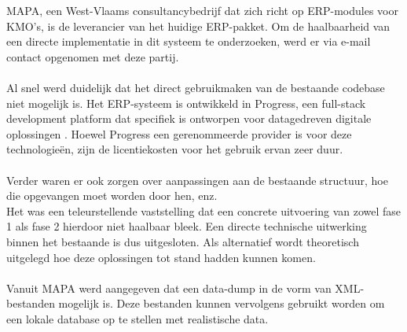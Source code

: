MAPA, een West-Vlaams consultancybedrijf dat zich richt op ERP-modules voor KMO's, is de leverancier van het huidige ERP-pakket. Om de haalbaarheid van een directe implementatie in dit systeem te onderzoeken, werd er via e-mail contact opgenomen met deze partij.
\\
\\
Al snel werd duidelijk dat het direct gebruikmaken van de bestaande codebase niet mogelijk is. Het ERP-systeem is ontwikkeld in Progress, een full-stack development platform dat specifiek is ontworpen voor datagedreven digitale oplossingen \autocite{PSC2026}. Hoewel Progress een gerenommeerde provider is voor deze technologieën, zijn de licentiekosten voor het gebruik ervan zeer duur.
\\
\\
Verder waren er ook zorgen over aanpassingen aan de bestaande structuur, hoe die opgevangen moet worden door hen, enz.
\\
Het was een teleurstellende vaststelling dat een concrete uitvoering van zowel fase 1 als fase 2 hierdoor niet haalbaar bleek. Een directe technische uitwerking binnen het bestaande is dus uitgesloten. Als alternatief wordt theoretisch uitgelegd hoe deze oplossingen tot stand hadden kunnen komen.
\\
\\
Vanuit MAPA werd aangegeven dat een data-dump in de vorm van XML-bestanden mogelijk is. Deze bestanden kunnen vervolgens gebruikt worden om een lokale database op te stellen met realistische data.
